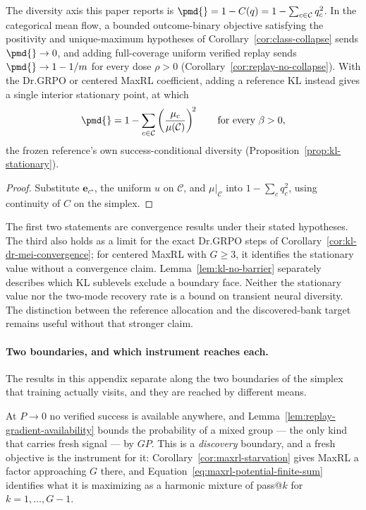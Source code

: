 \begin{corollary}
\enforcehalffinalproseline
\label{cor:pmd-limits}
The diversity axis this paper reports is
$\pmd{}=1-C(q)=1-\sum_{c\in\mathcal C}q_c^2$. In the categorical mean flow, a
bounded outcome-binary objective satisfying the positivity and unique-maximum
hypotheses of Corollary~\ref{cor:class-collapse} sends $\pmd{}\to0$, and adding full-coverage uniform verified
replay sends $\pmd{}\to1-1/m$ for every dose $\rho>0$
(Corollary~\ref{cor:replay-no-collapse}). With the Dr.GRPO or centered MaxRL coefficient, adding a reference KL
instead gives a single interior stationary point, at which
\[
 \pmd{}=1-\sum_{c\in\mathcal C}
   \left(\frac{\mu_c}{\mu(\mathcal C)}\right)^{\!2}
 \qquad\text{for every }\beta>0,
\]
the frozen reference's own success-conditional diversity
(Proposition~\ref{prop:kl-stationary}).
\end{corollary}

\begin{proof}
\enforcehalffinalproseline
Substitute $\mathbf e_{c^\star}$, the uniform $u$ on $\mathcal C$, and
$\mu|_{\mathcal C}$ into $1-\sum_cq_c^2$, using continuity of $C$ on the
simplex.
\end{proof}

The first two statements are convergence results under their stated
hypotheses. The third also holds as a limit for the exact Dr.GRPO steps of
Corollary~\ref{cor:kl-dr-mei-convergence}; for centered MaxRL with $G\ge3$,
it identifies the stationary value without a convergence claim.
Lemma~\ref{lem:kl-no-barrier} separately describes which KL sublevels
exclude a boundary face.
Neither the stationary value nor the two-mode recovery rate is a bound on
transient neural diversity. The distinction between the reference allocation
and the discovered-bank target remains useful without that stronger claim.

\paragraph{Two boundaries, and which instrument reaches each.}
The results in this appendix separate along the two boundaries of the simplex
that training actually visits, and they are reached by different means.

At $P\to0$ no verified success is available anywhere, and
Lemma~\ref{lem:replay-gradient-availability} bounds the probability of a
mixed group --- the only kind that carries fresh signal --- by $GP$. This is a
\emph{discovery} boundary, and a fresh objective is the instrument for it:
Corollary~\ref{cor:maxrl-starvation} gives MaxRL a factor approaching $G$
there, and Equation~\eqref{eq:maxrl-potential-finite-sum} identifies what it
is maximizing as a harmonic mixture of pass@$k$ for $k=1,\ldots,G-1$.


